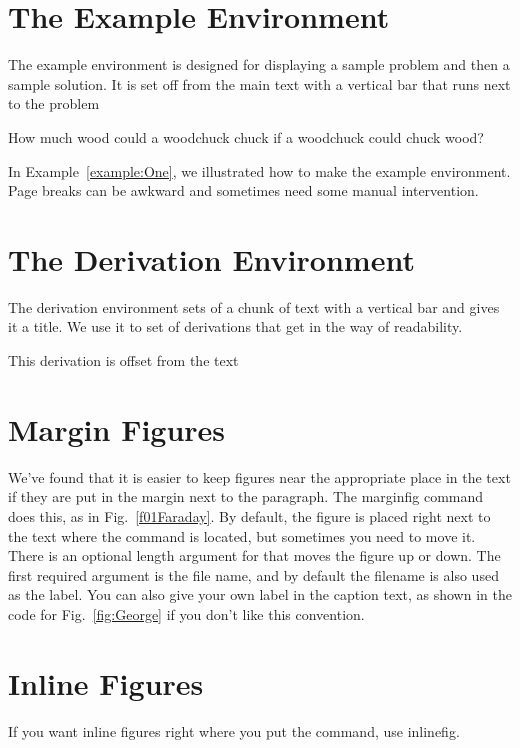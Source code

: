 \documentclass{BYUTextbook}
\begin{document}
\section{The Example Environment}

The example environment is designed for displaying a sample problem
and then a sample solution.  It is set off from the main text with
a vertical bar that runs next to the problem

\begin{example}
    \exProblem
    How much wood could a woodchuck chuck if a woodchuck
    could chuck wood? \label{example:One}
    \exSolution
        \lipsum[6]
\end{example}

In Example~\ref{example:One}, we illustrated how to make the
example environment. Page breaks can be awkward and sometimes need
some manual intervention.

\section{The Derivation Environment}

The derivation environment sets of a chunk of text with a vertical
bar and gives it a title.  We use it to set of derivations that get
in the way of readability.
\begin{derivation}{This derivation is offset from the text}
        \lipsum[6-7]
\end{derivation}

\section{Margin Figures}


We've found that it is easier to keep figures near the appropriate
place in the text if they are put in the margin next to the
paragraph.  The marginfig command does this, as in
Fig.~\ref{f01Faraday}.  By default, the figure is placed right next
to the text where the command is located, but sometimes you need to
move it.  There is an optional length argument for that moves the
figure up or down.  The first required argument is the file name,
and by default the filename is also used as the label.  You can
also give your own label in the caption text, as shown in the code
for Fig.~\ref{fig:George} if you don't like this convention.

\section{Inline Figures}
If you want inline figures right where you put the command, use
inlinefig.
\end{document}
